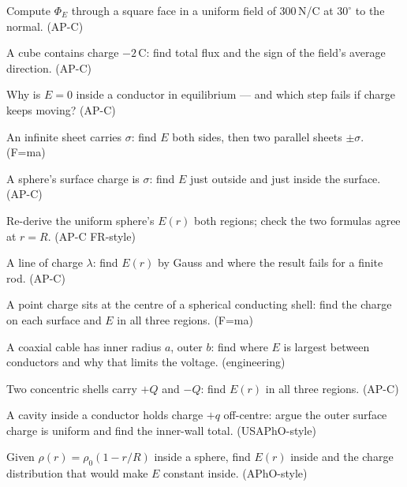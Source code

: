 \begin{exercise}[easy]
Compute $\Phi_E$ through a square face in a uniform field of
$300$\,N/C at $30^{\circ}$ to the normal. (AP-C)
\end{exercise}
\begin{exercise}[easy]
A cube contains charge $-2$\,\textmu C: find total flux and the sign
of the field's average direction. (AP-C)
\end{exercise}
\begin{exercise}[easy]
Why is $E=0$ inside a conductor in equilibrium --- and which step fails
if charge keeps moving? (AP-C)
\end{exercise}
\begin{exercise}[easy]
An infinite sheet carries $\sigma$: find $E$ both sides, then two
parallel sheets $\pm\sigma$. (F=ma)
\end{exercise}
\begin{exercise}[easy]
A sphere's surface charge is $\sigma$: find $E$ just outside and just
inside the surface. (AP-C)
\end{exercise}
\begin{exercise}[medium]
Re-derive the uniform sphere's $E(r)$ both regions; check the two
formulas agree at $r=R$. (AP-C FR-style)
\end{exercise}
\begin{exercise}[medium]
A line of charge $\lambda$: find $E(r)$ by Gauss and where the result
fails for a finite rod. (AP-C)
\end{exercise}
\begin{exercise}[medium]
A point charge sits at the centre of a spherical conducting shell:
find the charge on each surface and $E$ in all three regions. (F=ma)
\end{exercise}
\begin{exercise}[medium]
A coaxial cable has inner radius $a$, outer $b$: find where $E$ is
largest between conductors and why that limits the voltage.
(engineering)
\end{exercise}
\begin{exercise}[medium]
Two concentric shells carry $+Q$ and $-Q$: find $E(r)$ in all three
regions. (AP-C)
\end{exercise}
\begin{exercise}[hard]
A cavity inside a conductor holds charge $+q$ off-centre: argue the
outer surface charge is uniform and find the inner-wall total.
(USAPhO-style)
\end{exercise}
\begin{exercise}[hard]
Given $\rho(r)=\rho_0(1-r/R)$ inside a sphere, find $E(r)$ inside and
the charge distribution that would make $E$ constant inside.
(APhO-style)
\end{exercise}
